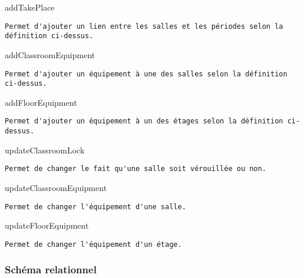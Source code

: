 \documentclass[12pt]{article}
\begin{document}
addTakePlace

\begin{verbatim}
Permet d'ajouter un lien entre les salles et les périodes selon la définition ci-dessus.
\end{verbatim}

addClassroomEquipment

\begin{verbatim}
Permet d'ajouter un équipement à une des salles selon la définition ci-dessus.
\end{verbatim}

addFloorEquipment

\begin{verbatim}
Permet d'ajouter un équipement à un des étages selon la définition ci-dessus.
\end{verbatim}

updateClassroomLock

\begin{verbatim}
Permet de changer le fait qu'une salle soit vérouillée ou non.
\end{verbatim}

updateClassroomEquipment

\begin{verbatim}
Permet de changer l'équipement d'une salle.
\end{verbatim}

updateFloorEquipment

\begin{verbatim}
Permet de changer l'équipement d'un étage.
\end{verbatim}

\hypertarget{header-n52}{%
\subsubsection{Schéma relationnel}\label{header-n52}}
\end{document}
